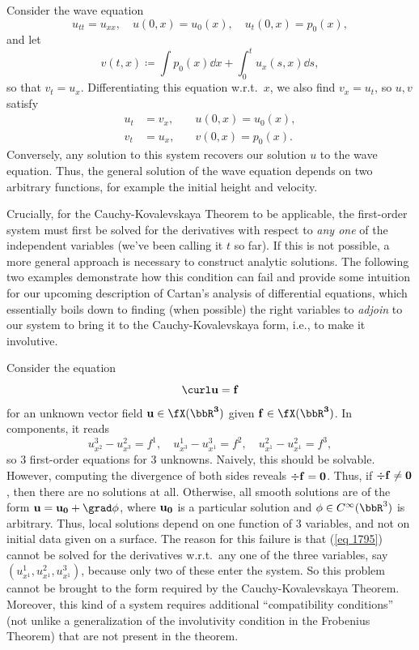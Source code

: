 \begin{example}\label{ex wave eq kovalevskaya}
    Consider the wave equation 
    \[u_{tt}=u_{xx},\quad u(0,x)=u_0(x),\quad u_t(0,x)=p_0(x),\]
    and let 
    \[v(t,x)\coloneqq \int p_0(x)\dd x+\int_0^t u_x(s,x)\dd s,\]
    so that $v_t=u_x$. Differentiating this equation w.r.t.\ $x$, we also find $v_x=u_t$, so $u,v$ satisfy 
    \begin{align}
        u_t&=v_x,\quad & u(0,x)=u_0(x),\\
        v_t&=u_x,\quad & v(0,x)=p_0(x).
    \end{align}
    Conversely, any solution to this system recovers our solution $u$ to the wave equation. Thus, the general solution of the wave equation depends on two arbitrary functions, for example the initial height and velocity.
\end{example}

Crucially, for the Cauchy-Kovalevskaya Theorem to be applicable, the first-order system must first be solved for the derivatives with respect to \emph{any one} of the independent variables (we've been calling it $t$ so far). If this is not possible, a more general approach is necessary to construct analytic solutions. The following two examples demonstrate how this condition can fail and provide some intuition for our upcoming description of Cartan's analysis of differential equations, which essentially boils down to finding (when possible) the right variables to \emph{adjoin} to our system to bring it to the Cauchy-Kovalevskaya form, i.e., to make it involutive.

\begin{example}
    Consider the equation 
    \[\curl \bf{u}=\bf{f}\]
    for an unknown vector field $\bf{u}\in\fX(\bbR^3)$ given $\bf{f}\in\fX(\bbR^3)$. In components, it reads 
    \[u^3_{x^2}-u^2_{x^3}=f^1,\quad u^1_{x^3}-u^3_{x^1}=f^2,\quad u^2_{x^1}-u^2_{x^1}=f^3,\label{eq 1795}\]
    so $3$ first-order equations for $3$ unknowns. Naively, this should be solvable. However, computing the divergence of both sides reveals $\div \bf{f}=0$. Thus, if $\div\bf{f}\neq 0$, then there are no solutions at all. Otherwise, all smooth solutions are of the form $\bf{u}=\bf{u}_0+\grad \phi$, where $\bf{u}_0$ is a particular solution and $\phi\in C^\infty(\bbR^3)$ is arbitrary. Thus, local solutions depend on one function of $3$ variables, and not on initial data given on a surface. The reason for this failure is that (\ref{eq 1795}) cannot be solved for the derivatives w.r.t.\ any one of the three variables, say $(u^1_{x^1},u^2_{x^1},u^3_{x^1})$, because only two of these enter the system. So this problem cannot be brought to the form required by the Cauchy-Kovalevskaya Theorem. Moreover, this kind of a system requires additional ``compatibility conditions'' (not unlike a generalization of the involutivity condition in the Frobenius Theorem) that are not present in the theorem.
\end{example}


